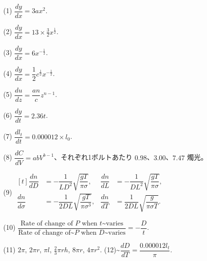 \documentclass[a4paper,11pt,openany]{ltjsbook}
\begin{document}
\begin{enumerate}
\item[(1)] $\dfrac{dy}{dx} = 3ax^2$.
\item[(2)] $\dfrac{dy}{dx} = 13 \times  \frac{3}{2}x^{\frac{1}{2}}$.
\item[(3)] $\dfrac{dy}{dx} = 6x^{-\frac{1}{2}}$.
\item[(4)] $\dfrac{dy}{dx} = \dfrac{1}{2}c^{\frac{1}{2}} x^{-\frac{1}{2}}$.
\item[(5)] $\dfrac{du}{dz} = \dfrac{an}{c} z^{n-1}$.
\item[(6)] $\dfrac{dy}{dt} = 2.36t$.
\item[(7)] $\dfrac{dl_t}{dt} = 0.000012\times l_0$.
\item[(8)] $\dfrac{dC}{dV} = abV^{b-1}$、それぞれ1ボルトあたり $0.98$、$3.00$、$7.47$ 燭光。
\item[(9)] $\begin{aligned}[t]
  \dfrac{dn}{dD} &= -\dfrac{1}{LD^2} \sqrt{\dfrac{gT}{\pi \sigma}}, &
  \dfrac{dn}{dL} &= -\dfrac{1}{DL^2} \sqrt{\dfrac{gT}{\pi \sigma}}, \\
%
  \dfrac{dn}{d \sigma}
  &= -\dfrac{1}{2DL} \sqrt{\dfrac{gT}{\pi \sigma^3}}, &
  \dfrac{dn}{dT} &=  \dfrac{1}{2DL} \sqrt{\dfrac{g}{\pi \sigma T}}.
\end{aligned}$
\item[(10)] $\dfrac{\text{Rate of change of~$P$ when $t$\textasciitilde{}varies}}
            {\text{Rate of change of\textasciitilde{}$P$ when $D$\textasciitilde{}varies}}
  = - \dfrac{D}{t}$.
\item[(11)] $2\pi$, $2\pi r$, $\pi l$, $\frac{2}{3}\pi rh$, $8\pi r$, $4\pi r^2$. \hfil
(12)\textasciitilde{}$\dfrac{dD}{dT} = \dfrac{0.000012l_t}{\pi}$.
\par\smallskip
\end{enumerate}
\par\bigskip{}\par\smallskip
\end{document}
